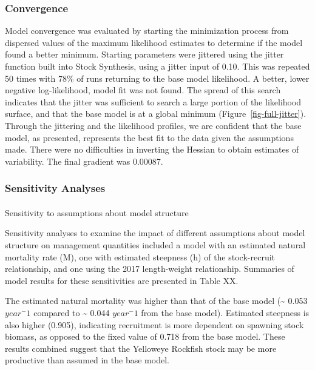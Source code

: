 \documentclass[
]{scrartcl}
\makeatletter
\let\oldparagraph\paragraph
\renewcommand{\paragraph}{
    \@ifstar
      \xxxParagraphStar
      \xxxParagraphNoStar
  }
\newcommand{\xxxParagraphStar}[1]{\oldparagraph*{#1}\mbox{}}
\newcommand{\xxxParagraphNoStar}[1]{\oldparagraph{#1}\mbox{}}
\makeatother
\begin{document}
\subsubsection{Convergence}\label{convergence}

Model convergence was evaluated by starting the minimization process
from dispersed values of the maximum likelihood estimates to determine
if the model found a better minimum. Starting parameters were jittered
using the jitter function built into Stock Synthesis, using a jitter
input of 0.10. This was repeated 50 times with 78\% of runs returning to
the base model likelihood. A better, lower negative log-likelihood,
model fit was not found. The spread of this search indicates that the
jitter was sufficient to search a large portion of the likelihood
surface, and that the base model is at a global minimum
(Figure~\ref{fig-full-jitter}). Through the jittering and the likelihood
profiles, we are confident that the base model, as presented, represents
the best fit to the data given the assumptions made. There were no
difficulties in inverting the Hessian to obtain estimates of
variability. The final gradient was 0.00087.

\subsubsection{Sensitivity Analyses}\label{sensitivity-analyses}

\paragraph{Sensitivity to assumptions about model
structure}\label{sensitivity-to-assumptions-about-model-structure}

Sensitivity analyses to examine the impact of different assumptions
about model structure on management quantities included a model with an
estimated natural mortality rate (M), one with estimated steepness (h)
of the stock-recruit relationship, and one using the 2017 length-weight
relationship. Summaries of model results for these sensitivities are
presented in Table XX.

The estimated natural mortality was higher than that of the base model
(\textasciitilde{} 0.053 \(year^-1\) compared to \textasciitilde{} 0.044
\(year^-1\) from the base model). Estimated steepness is also higher
(0.905), indicating recruitment is more dependent on spawning stock
biomass, as opposed to the fixed value of 0.718 from the base model.
These results combined suggest that the Yelloweye Rockfish stock may be
more productive than assumed in the base model.
\end{document}
